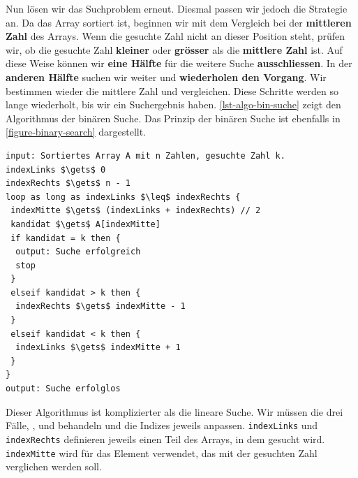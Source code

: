 Nun lösen wir das Suchproblem erneut. Diesmal passen wir jedoch die Strategie an. Da das Array sortiert ist, beginnen wir mit dem Vergleich bei der \textbf{mittleren Zahl} des Arrays. Wenn die gesuchte Zahl nicht an dieser Position steht, prüfen wir, ob die gesuchte Zahl \textbf{kleiner} oder \textbf{grösser} als die \textbf{mittlere Zahl} ist. Auf diese Weise können wir \textbf{eine Hälfte} für die weitere Suche \textbf{ausschliessen}. In der \textbf{anderen Hälfte} suchen wir weiter und \textbf{wiederholen den Vorgang}. Wir bestimmen wieder die mittlere Zahl und vergleichen. Diese Schritte werden so lange wiederholt, bis wir ein Suchergebnis haben. \autoref{lst-algo-bin-suche} zeigt den Algorithmus der binären Suche. Das Prinzip der binären Suche ist ebenfalls in \autoref{figure-binary-search} dargestellt.

\begin{lstlisting}[language=pseudocode, caption={Binäre Suche (mit // in Code-Zeile 5 bedeutet ganzzahlige Division).}, label={lst-algo-bin-suche}]
input: Sortiertes Array A mit n Zahlen, gesuchte Zahl k.
indexLinks $\gets$ 0
indexRechts $\gets$ n - 1
loop as long as indexLinks $\leq$ indexRechts {
 indexMitte $\gets$ (indexLinks + indexRechts) // 2
 kandidat $\gets$ A[indexMitte]
 if kandidat = k then {
  output: Suche erfolgreich
  stop
 }
 elseif kandidat > k then {
  indexRechts $\gets$ indexMitte - 1
 }
 elseif kandidat < k then {
  indexLinks $\gets$ indexMitte + 1
 }
}
output: Suche erfolglos
\end{lstlisting}

Dieser Algorithmus ist komplizierter als die lineare Suche. Wir müssen die drei Fälle, ,  und  behandeln und die Indizes jeweils anpassen. \lstinline[language=pseudocode]{indexLinks} und \lstinline[language=pseudocode]{indexRechts} definieren jeweils einen Teil des Arrays, in dem gesucht wird. \lstinline[language=pseudocode]{indexMitte} wird für das Element verwendet, das mit der gesuchten Zahl verglichen werden soll.

